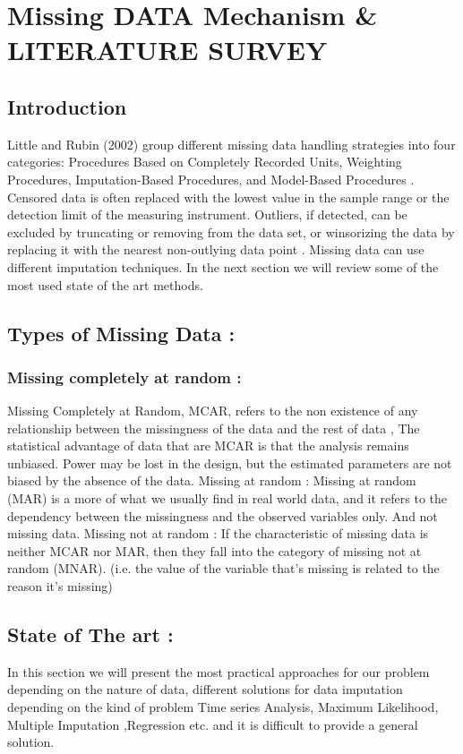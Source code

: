 

\chapter{Missing DATA Mechanism \& LITERATURE SURVEY} \label{chapter1}

\section{Introduction}

Little and Rubin (2002) \cite{Little2002} group different missing data handling strategies into four categories: Procedures Based on Completely Recorded Units, Weighting Procedures, Imputation-Based Procedures, and Model-Based Procedures \cite{Little2002}. Censored data is often replaced with the lowest value in the sample range or the detection limit of the measuring instrument.
Outliers, if detected, can be excluded by truncating or removing from the data set, or winsorizing the data by replacing it with the nearest non-outlying data point \cite{Hastings1947}. Missing data can use different imputation techniques. In the next section we will review some of the most used state of the art methods.


\section{Types of Missing Data :} 

\subsection{Missing completely at random :}

Missing Completely at Random, MCAR,  refers to the non existence of any relationship between the missingness of the data and the rest of data , The statistical advantage of data that are MCAR is that the analysis remains unbiased. Power may be lost in the design, but the estimated parameters are not biased by the absence of the data.
Missing at random : Missing at random (MAR) is a more of what we usually find in real world data,  and it refers to the dependency between the missingness and the observed variables only. And not missing data.
Missing not at random : If the characteristic  of missing data  is neither MCAR nor MAR, then they fall into the category of missing not at random (MNAR). (i.e. the value of the variable that's missing is related to the reason it's missing)

\section{ State of The art :}
In this section we will present the most practical approaches for our problem depending on the nature of data, different solutions for data imputation depending on the kind of problem Time series Analysis, Maximum Likelihood, Multiple Imputation ,Regression etc. and it is difficult to provide a general solution.

